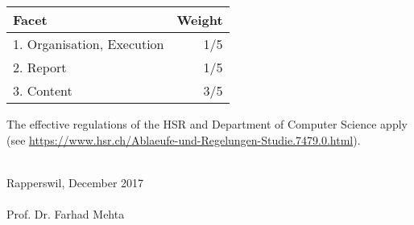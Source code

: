 \documentclass[a4paper]{article}
\begin{document}
\begin{center}
	\noindent
	\begin{tabulary}{1.0\textwidth}{| L | R |}
		\hline
		Facet & Weight \\ . Organisation, Execution	& 1/5 \\
		2. Report	& 1/5 \\
		3. Content	& 3/5 \\
		\hline
	\end{tabulary}
\end{center}


The effective regulations of the HSR and Department of Computer Science apply (see \url{https://www.hsr.ch/Ablaeufe-und-Regelungen-Studie.7479.0.html}).

\pagebreak
\noindent
\vspace{2cm}\\
Rapperswil, December 2017\\
\vspace{1.5cm}\\
\noindent
Prof. Dr. Farhad Mehta




\end{document}
